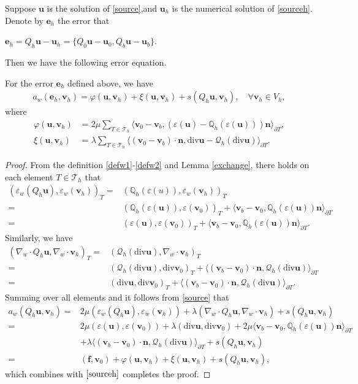 \documentclass[leqno,CJK]{siamltex704}
\numberwithin{equation}{section}
\def\Q{{\mathcal{Q}}}
\def\dQ{{\mathbb{Q}}}
\def\bu{{\mathbf{u}}}
\def\bv{{\mathbf{v}}}
\def\bn{{\mathbf{n}}}
\def\be{{\mathbf{e}}}
\def\bf{{\mathbf{f}}}
\newcommand{\di}{\text{div}}
\newcommand{\la}{\langle}
\newcommand{\ra}{\rangle_{\partial T}}
\begin{document}
Suppose $\bu$ is the solution of \eqref{source},and $\bu_h$ is the numerical solution of \eqref{sourceh}. Denote by $\be_h$ the error that
\begin{center}
	$\be_h=Q_h\bu-\bu_h=\{Q_0\bu-\bu_0,Q_b\bu-\bu_b\}$.
\end{center}
Then we have the following error equation.
\begin{lemma}
	For the error $\be_h$ defined above, we have
	\begin{eqnarray}\label{errequ}
		a_w(\be_h,\bv_h)=\varphi(\bu,\bv_h)+\xi(\bu,\bv_h)+s(Q_h\bu,\bv_h),\quad\forall \bv_h\in V_h,
	\end{eqnarray}
	where
	\begin{align*}
		\varphi(\bu,\bv_h)&=2\mu\sum\limits_{T\in\mathcal{T}_h}\la \bv_0-\bv_b,(\varepsilon(\bu)-\dQ_h(\varepsilon(\bu)))\bn\ra,
		\\
		\xi(\bu,\bv_h)&=\lambda\sum\limits_{T\in\mathcal{T}_h}\la (\bv_0-\bv_b)\cdot\bn,\di\bu-\Q_h(\di\bu)\ra.
	\end{align*}
\end{lemma}
\begin{proof}
	From the definition \eqref{defw1}-\eqref{defw2} and Lemma \ref{exchange}, there holds on each element $T\in\mathcal{T}_h$ that
	\begin{align}\label{1}
			(\varepsilon_w(Q_h\bu),\varepsilon_w(\bv_h))_T=&
			(\dQ_h(\varepsilon(u)),\varepsilon_w(\bv_h))_T\nonumber
			\\
			=&(\dQ_h(\varepsilon(\bu)),\varepsilon(\bv_0))_T+\la \bv_b-\bv_0,\dQ_h(\varepsilon(\bu))\bn\ra
			\\
			=&(\varepsilon(\bu),\varepsilon(\bv_0))_T+\la \bv_b-\bv_0,\dQ_h(\varepsilon(\bu))\bn\ra.\nonumber
	\end{align}	
	Similarly, we have
	\begin{align}\label{2}
			(\nabla_w\cdot Q_h\bu,\nabla_w\cdot\bv_h)_T=&
			(\Q_h(\di\bu),\nabla_w\cdot\bv_h)_T\nonumber
			\\
			=&(\Q_h(\di\bu),\di\bv_0)_T+\la (\bv_b-\bv_0)\cdot\bn,\Q_h(\di\bu)\ra
			\\
			=&(\di\bu,\di\bv_0)_T+\la (\bv_b-\bv_0)\cdot\bn,\Q_h(\di\bu)\ra.\nonumber
	\end{align}
	Summing over all elements and it follows from \eqref{source} that
	\begin{align*}
		a_w(Q_h\bu,\bv_h)=&
		2\mu(\varepsilon_w (Q_h\bu),\varepsilon_w(\bv_h))+\lambda(\nabla_w\cdot Q_h\bu,\nabla_w\cdot\bv_h)+s(Q_h\bu,\bv_h)
		\\
		=&
		2\mu(\varepsilon(\bu),\varepsilon(\bv_0))+\lambda(\di\bu,\di\bv_0)
		+2\mu\la \bv_b-\bv_0,\dQ_h(\varepsilon(\bu))\bn\ra
		\\
		\quad&+\lambda\la (\bv_b-\bv_0)\cdot\bn,\Q_h(\di\bu)\ra+s(Q_h\bu,\bv_h)
		\\
		=&(\bf,\bv_0)+\varphi(\bu,\bv_h)+\xi(\bu,\bv_h)+s(Q_h\bu,\bv_h),
	\end{align*}
	which combines with $\eqref{sourceh}$ completes the proof.
\end{proof}
\end{document}
